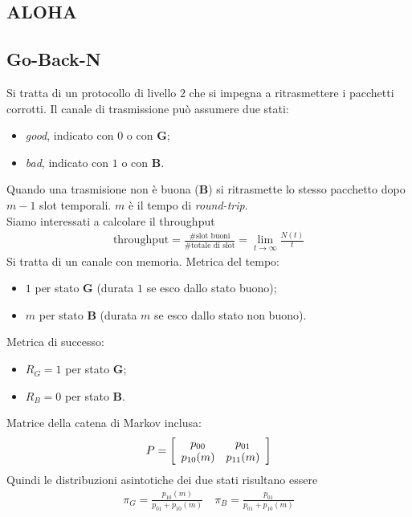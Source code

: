 \documentclass{article}
\begin{document}
\subsection{ALOHA}

\subsection{Go-Back-N}

Si tratta di un protocollo di livello $2$ che si impegna a ritrasmettere i pacchetti corrotti. Il canale di trasmissione può assumere due stati:
\begin{itemize}
    \item \emph{good}, indicato con $0$ o con \textbf{G};
    \item \emph{bad}, indicato con $1$ o con \textbf{B}.
\end{itemize}
Quando una trasmisione non è buona (\textbf{B}) si ritrasmette lo stesso pacchetto dopo $m-1$ slot temporali. $m$ è il tempo di \emph{round-trip}.\\
Siamo interessati a calcolare il throughput
\begin{align*}
\text{throughput} = \frac{\text{\# slot buoni}}{\text{\# totale di slot}} = \lim_{t\to\infty}\frac{N(t)}{t}
\end{align*}
Si tratta di un canale con memoria. Metrica del tempo:
\begin{itemize}
    \item $1$ per stato \textbf{G} (durata $1$ se esco dallo stato buono);
    \item $m$ per stato \textbf{B} (durata $m$ se esco dallo stato non buono).
\end{itemize}
Metrica di successo:
\begin{itemize}
    \item $R_G = 1$ per stato \textbf{G};
    \item $R_B = 0$ per stato \textbf{B}.
\end{itemize}
Matrice della catena di Markov inclusa:
\begin{align*}
P = \left[\begin{array}{c c}
p_{00} & p_{01}\\
p_{10}(m) & p_{11}(m)
\end{array}\right]
\end{align*}
Quindi le distribuzioni asintotiche dei due stati risultano essere
\begin{gather*}
\pi_G = \frac{p_{10}(m)}{p_{01} + p_{10}(m)} \quad \pi_B = \frac{p_{01}}{p_{01} + p_{10}(m)}
\end{gather*}
\end{document}
